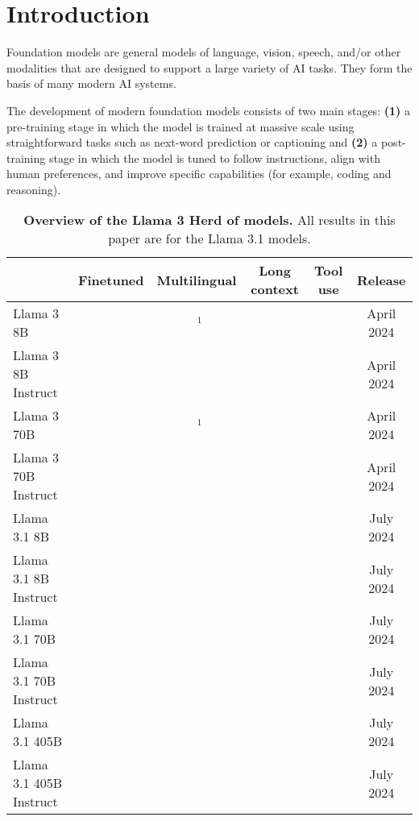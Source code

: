 \section{Introduction}
\label{section:introduction}

Foundation models are general models of language, vision, speech, and/or other modalities that are designed to support a large variety of AI tasks. 
They form the basis of many modern AI systems. 

The development of modern foundation models consists of two main stages: \textbf{(1)} a pre-training stage in which the model is trained at massive scale using straightforward tasks such as next-word prediction or captioning and \textbf{(2)} a post-training stage in which the model is tuned to follow instructions, align with human preferences, and improve specific capabilities (for example, coding and reasoning). 

\begin{table}[t]
	\centering
	\begin{tabular}{l|ccccc}
	\toprule
	& \textbf{Finetuned}  & \textbf{Multilingual} & \textbf{Long context} & \textbf{Tool use} & \textbf{Release}\\
	\midrule
	Llama 3 8B  & \xmark & ~\xmark$^\textrm{1}$ & \xmark & \xmark & April 2024  \\
	Llama 3 8B Instruct & \cmark & \xmark &  \xmark & \xmark & April 2024  \\
	Llama 3 70B  & \xmark & ~\xmark$^\textrm{1}$ & \xmark & \xmark & April 2024  \\
	Llama 3 70B Instruct & \cmark & \xmark & \xmark & \xmark & April 2024  \\
	Llama 3.1 8B  & \xmark & \cmark & \cmark & \xmark & July 2024  \\
	Llama 3.1 8B Instruct & \cmark & \cmark & \cmark & \cmark & July 2024  \\
	Llama 3.1 70B  & \xmark & \cmark & \cmark & \xmark & July 2024  \\
	Llama 3.1 70B Instruct & \cmark & \cmark & \cmark & \cmark & July 2024  \\
	Llama 3.1 405B  & \xmark & \cmark & \cmark & \xmark & July 2024  \\
	Llama 3.1 405B Instruct & \cmark & \cmark & \cmark & \cmark & July 2024  \\
	\bottomrule
	\end{tabular}
		\caption{\textbf{Overview of the Llama 3 Herd of models.} All results in this paper are for the Llama 3.1 models.}
	\label{table:family_of_models}
\end{table}

